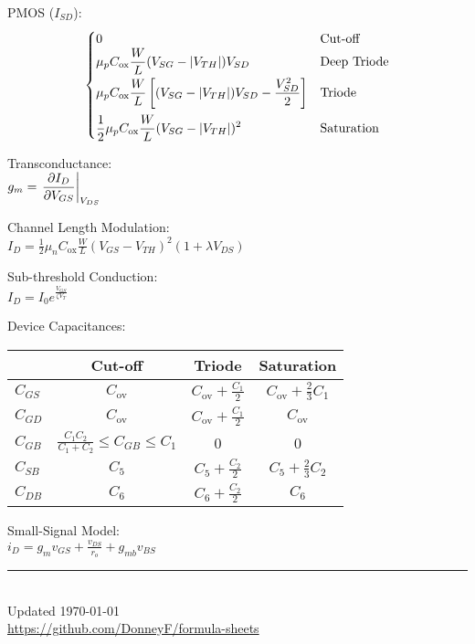 \documentclass[12pt,landscape]{article}
\newcommand{\tab}{\hspace*{1em}}
\newcommand{\ds}{\displaystyle}
\theoremstyle{definition}
\begin{document}
\begin{multicols}{3}
\tab PMOS ($I_{SD}$):
\begin{equation*}
\begin{cases}
0 & \text{Cut-off}\\
\ds \mu_p C_\text{ox} \frac{W}{L} (V_{SG} - \abs{V_{TH}}) V_{SD} & \text{Deep Triode}\\[0.5em]
\ds \mu_p C_\text{ox} \frac{W}{L} \left[(V_{SG} - \abs{V_{TH}}) V_{SD} - \frac{V_{SD}^2}{2}\right] & \text{Triode}\\[1em]
\ds \frac{1}{2} \mu_p C_\text{ox} \frac{W}{L} (V_{SG} - \abs{V_{TH}})^2 & \text{Saturation}
\end{cases}
\end{equation*}

Transconductance:\\
\tab $\ds g_m = \eval{\pdv{I_D}{V_{GS}}}_{V_{DS}}$

Channel Length Modulation:\\
\tab $\ds I_D = \frac{1}{2} \mu_n C_\text{ox} \frac{W}{L} (V_{GS} - V_{TH})^2 (1 + \lambda V_{DS})$

Sub-threshold Conduction:\\
\tab $I_D = I_0 e^{\frac{V_{GS}}{\zeta V_T}}$

Device Capacitances:\\
\bgroup
\def\arraystretch{1.2}%
\tab \begin{tabular}{|l|c | c |c |} 
\hline
& Cut-off & Triode & Saturation\\
\hline
$C_{GS}$ & $C_\text{ov}$ & $C_\text{ov} + \frac{C_1}{2}$ & $C_\text{ov} + \frac{2}{3}C_1$\\
\hline
$C_{GD}$ & $C_\text{ov}$ & $C_\text{ov} + \frac{C_1}{2}$ & $C_\text{ov}$\\
\hline
$C_{GB}$ & $\frac{C_1 C_2}{C_1 + C_2} \leq C_{GB} \leq C_1$ & 0 & 0\\
\hline
$C_{SB}$ & $C_5$ & $C_5 + \frac{C_2}{2}$ & $C_5 + \frac{2}{3}C_2$\\
\hline
$C_{DB}$ & $C_6$ & $C_6 + \frac{C_2}{2}$ & $C_6$\\
\hline
\end{tabular}
\egroup

Small-Signal Model:\\
\tab $\ds i_D = g_m v_{GS} + \frac{v_{DS}}{r_o} + g_{mb}v_{BS}$

\rule{0.3\linewidth}{0.25pt}
\scriptsize\\
Updated \today\\
\href{https://github.com/DonneyF/formula-sheets}{https://github.com/DonneyF/formula-sheets}
\end{multicols}%
\end{document}
